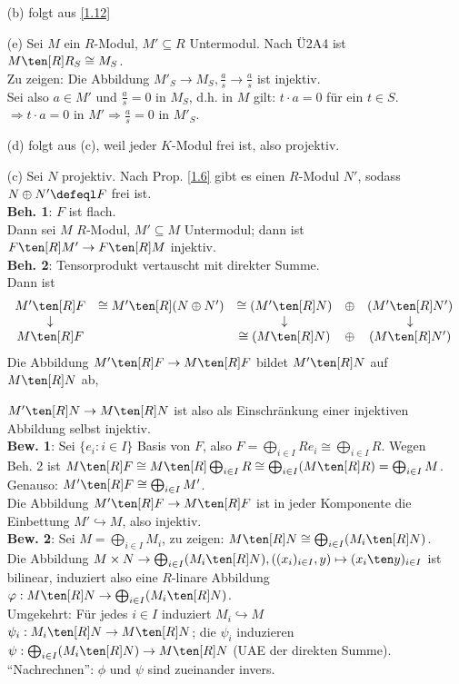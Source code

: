 \begin{Bew}
\begin{enumerate}
\item[(b)] folgt aus \ref{1.12}
\item[(e)] Sei $M$ ein $R$-Modul, $M'\subseteq R$ Untermodul.
Nach \"U2A4 ist $M\ten[R] R_S \cong M_S$.\\
Zu zeigen: Die Abbildung $M'_S\to M_S, \frac{a}{s}\to \frac{a}{s}$ ist injektiv. \\
Sei also $a\in M'$ und $\frac{a}{s}=0$ in $M_S$, d.h. in $M$ gilt: $t\cdot a=0$ f\"ur ein $t\in S$.
$\Rightarrow t\cdot a = 0$ in $M'\Rightarrow \frac{a}{s}=0$ in $M'_S$.
\item[(d)] folgt aus (c), weil jeder $K$-Modul frei ist, also projektiv.
\item[(c)] Sei $N$ projektiv. Nach Prop. \ref{1.6} gibt es einen $R$-Modul
$N'$, sodass $N \oplus N'\defeql F$ frei ist.\\ \textbf{Beh. 1}: $F$ ist flach.\\
Dann sei $M$ $R$-Modul, $M'\subseteq M$ Untermodul; dann ist $F\ten[R] M'\to F\ten[R] M$ injektiv.\\
\textbf{Beh. 2}: Tensorprodukt vertauscht mit direkter Summe.\\
Dann ist
\[
\begin{array}{ccccc}
M'\ten[R] F & \cong M'\ten[R](N\oplus N')   &\cong (M'\ten[R] N)&\oplus &(M'\ten[R] N') \\
\downarrow &                                 &\downarrow               &   &\downarrow\\
M\ten[R] F &                               &\cong (M\ten[R] N)&\oplus &(M\ten[R] N')\\
\end{array}
\]
Die Abbildung $M'\ten[R] F\to M\ten[R] F$ bildet $M'\ten[R] N$ auf $M\ten[R] N$ ab,

$M'\ten[R] N\to M\ten[R] N$ ist also als Einschr\"ankung einer injektiven Abbildung selbst injektiv.\\
\textbf{Bew. 1}: Sei $\{e_i:i\in I\}$ Basis  von $F$, also $F=\bigoplus_{i\in I} R e_i\cong \bigoplus_{i\in I} R$.
Wegen Beh. 2 ist $M\ten[R] F\cong M\ten[R] \bigoplus_{i\in I}R\cong \bigoplus_{i\in I}(M\ten[R] R)=\bigoplus_{i\in I}M$.
Genauso: $M' \ten[R] F\cong \bigoplus_{i\in I}M'$.\\
Die Abbildung $M'\ten[R] F\to M\ten[R] F$ ist in jeder Komponente die Einbettung $M'\hookrightarrow M$, also injektiv.\\
\textbf{Bew. 2}: Sei $M=\bigoplus_{i\in I} M_i$, zu zeigen: $M\ten[R] N \cong \bigoplus_{i\in I}(M_i\ten[R] N)$.\\
Die Abbildung $M\times N \to \bigoplus_{i\in I} (M_i\ten[R] N), \left((x_i)_{i \in I}, y\right)\mapsto (x_i\ten y)_{i\in I}$ ist bilinear, induziert
also eine $R$-linare Abbildung $\varphi: M\ten[R] N\to \bigoplus_{i\in I}(M_i\ten[R] N)$.\\
Umgekehrt: F\"ur jedes $i\in I$ induziert $M_i\hookrightarrow M$ $\psi_i : M_i\ten[R] N\to M\ten[R] N$;
die $\psi_i$ induzieren $\psi:\bigoplus_{i\in I}(M_i\ten[R] N)\to M\ten[R] N$ (UAE der direkten Summe).
``Nachrechnen'': $\phi$ und $\psi$ sind zueinander invers. 
\end{enumerate}
\end{Bew}
